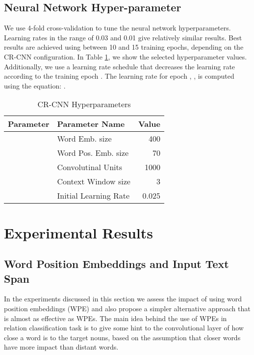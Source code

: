 \documentclass[11pt]{article}
\begin{document}
\subsection{Neural Network Hyper-parameter}
We use 4-fold cross-validation to tune the neural network hyperparameters.
Learning rates in the range of 0.03 and 0.01 give relatively similar results.
Best results are achieved using between 10 and 15 training epochs,
depending on the CR-CNN configuration.
In Table \ref{tab:nn_hyperparams}, 
we show the selected hyperparameter values.
Additionally,
we use a learning rate schedule that decreases the learning rate  according to the training epoch .
The learning rate for epoch , 
, 
is computed using the equation:
.

\begin{table}[h!]
\begin{center}
\begin{tabular}{|l|l|r|}
\hline  
\bf Parameter & \bf Parameter Name & \bf Value\\
\hline
 & Word Emb. size          & 400   \\
 & Word Pos. Emb. size   & 70   \\
   & Convolutinal Units    & 1000  \\ 
       & Context Window size   & 3     \\ 
 & Initial Learning Rate & 0.025 \\
\hline
\end{tabular}
\end{center}
\caption{\label{tab:nn_hyperparams} CR-CNN Hyperparameters }
\end{table}
 \section{Experimental Results}
\label{sec:results}

\subsection{Word Position Embeddings and Input Text Span}
\label{sec:textspan}
In the experiments discussed in this section we assess the impact of using word position embeddings (WPE) and also propose a simpler alternative approach that is almost as effective as WPEs. 
The main idea behind the use of WPEs in relation classification task is to give some hint to the convolutional layer of how close a word is to the target nouns,
based on the assumption that closer words have more impact than distant words.
\end{document}

